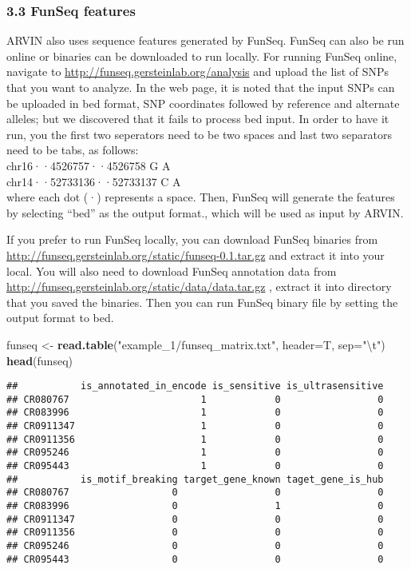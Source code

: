 \documentclass[]{article}
\newenvironment{Shaded}{\begin{snugshade}}{\end{snugshade}}
\newcommand{\KeywordTok}[1]{\textcolor[rgb]{0.13,0.29,0.53}{\textbf{#1}}}
\newcommand{\DataTypeTok}[1]{\textcolor[rgb]{0.13,0.29,0.53}{#1}}
\newcommand{\CharTok}[1]{\textcolor[rgb]{0.31,0.60,0.02}{#1}}
\newcommand{\StringTok}[1]{\textcolor[rgb]{0.31,0.60,0.02}{#1}}
\newcommand{\NormalTok}[1]{#1}
\begin{document}
\subsubsection{3.3 FunSeq features}\label{funseq-features}

ARVIN also uses sequence features generated by FunSeq. FunSeq can also
be run online or binaries can be downloaded to run locally. For running
FunSeq online, navigate to \url{http://funseq.gersteinlab.org/analysis}
and upload the list of SNPs that you want to analyze. In the web page,
it is noted that the input SNPs can be uploaded in bed format, SNP
coordinates followed by reference and alternate alleles; but we
discovered that it fails to process bed input. In order to have it run,
you the first two seperators need to be two spaces and last two
separators need to be tabs, as follows:\\
chr16··4526757··4526758 G A\\
chr14··52733136··52733137 C A\\
where each dot (·) represents a space. Then, FunSeq will generate the
features by selecting ``bed'' as the output format., which will be used
as input by ARVIN.

If you prefer to run FunSeq locally, you can download FunSeq binaries
from \url{http://funseq.gersteinlab.org/static/funseq-0.1.tar.gz} and
extract it into your local. You will also need to download FunSeq
annotation data from
\url{http://funseq.gersteinlab.org/static/data/data.tar.gz} , extract it
into directory that you saved the binaries. Then you can run FunSeq
binary file by setting the output format to bed.

\begin{Shaded}
\begin{Highlighting}[]
\NormalTok{funseq <-}\StringTok{ }\KeywordTok{read.table}\NormalTok{(}\StringTok{"example_1/funseq_matrix.txt"}\NormalTok{, }\DataTypeTok{header=}\NormalTok{T, }\DataTypeTok{sep=}\StringTok{"}\CharTok{\textbackslash{}t}\StringTok{"}\NormalTok{)}
\KeywordTok{head}\NormalTok{(funseq)}
\end{Highlighting}
\end{Shaded}

\begin{verbatim}
##           is_annotated_in_encode is_sensitive is_ultrasensitive
## CR080767                       1            0                 0
## CR083996                       1            0                 0
## CR0911347                      1            0                 0
## CR0911356                      1            0                 0
## CR095246                       1            0                 0
## CR095443                       1            0                 0
##           is_motif_breaking target_gene_known taget_gene_is_hub
## CR080767                  0                 0                 0
## CR083996                  0                 1                 0
## CR0911347                 0                 0                 0
## CR0911356                 0                 0                 0
## CR095246                  0                 0                 0
## CR095443                  0                 0                 0
\end{verbatim}
\end{document}
